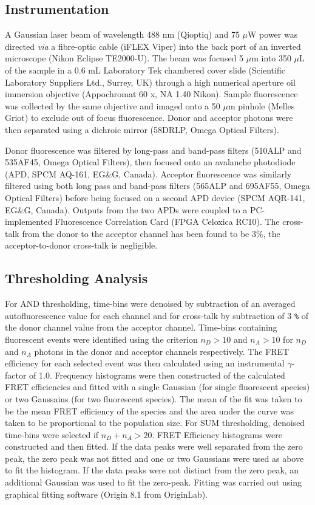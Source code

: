 \subsection*{Instrumentation}
\label{subsect:experimental}
A Gaussian laser beam of wavelength 488 nm (Qioptiq) and 75 $\mu$W power was directed \emph{via} a fibre-optic cable (iFLEX Viper) into the back port of an inverted microscope (Nikon Eclipse TE2000-U). The beam was focused 5 $\mu$m into 350 $\mu$L of the sample in a 0.6 mL Laboratory Tek chambered cover slide (Scientific Laboratory Suppliers Ltd., Surrey, UK) through a high numerical aperture oil immersion objective (Appochromat 60 x, NA 1.40 Nikon). Sample fluorescence was collected by the same objective and imaged onto a 50 $\mu$m pinhole (Melles Griot) to exclude out of focus fluorescence. Donor and acceptor photons were then separated using a dichroic mirror (58DRLP, Omega Optical Filters).

Donor fluorescence was filtered by long-pass and band-pass filters (510ALP and 535AF45, Omega Optical Filters), then focused onto an avalanche photodiode (APD, SPCM AQ-161, EG\&G, Canada).  Acceptor fluorescence was similarly filtered using both long pass and band-pass filters (565ALP and 695AF55, Omega Optical Filters) before being focused on a second APD device (SPCM AQR-141, EG\&G, Canada).  Outputs from the two APDs were coupled to a PC-implemented Fluorescence Correlation Card (FPGA Celoxica RC10). The cross-talk from the donor to the acceptor channel has been found to be 3\%, the acceptor-to-donor cross-talk is negligible.

\subsection*{Thresholding Analysis}
\label{subsect:thresholding}
For AND thresholding, time-bins were denoised by subtraction of an averaged autofluorescence value for each channel and for cross-talk by subtraction of 3 \verb|%| of the donor channel value from the acceptor channel. Time-bins containing fluorescent events were identified using the criterion $n_D > 10$ and $n_A > 10$ for $n_D$ and $n_A$ photons in the donor and acceptor channels respectively. The FRET efficiency for each selected event was then calculated using an instrumental $\gamma$-factor of 1.0. Frequency histograms were then constructed of the calculated FRET efficiencies and fitted with a single Gaussian (for single fluorescent species) or two Gaussains (for two fluorescent species). The mean of the fit was taken to be the mean FRET efficiency of the species and the area under the curve was taken to be proportional to the population size. For SUM thresholding, denoised time-bins were selected if $n_D + n_A > 20$. FRET Efficiency histograms were constructed and then fitted. If the data peaks were well separated from the zero peak, the zero peak was not fitted and one or two Gaussians were used as above to fit the histogram. If the data peaks were not distinct from the zero peak, an additional Gaussian was used to fit the zero-peak. Fitting was carried out using graphical fitting software (Origin 8.1 from OriginLab). 


